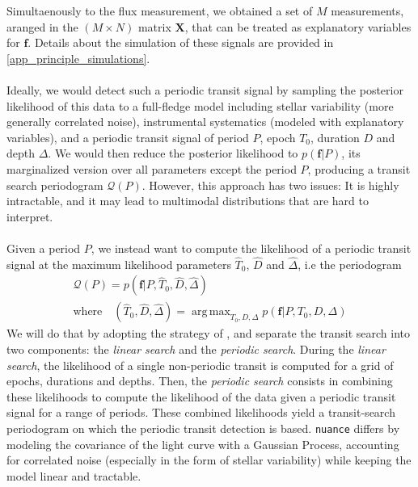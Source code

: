 \documentclass{aastex631}
\DeclareMathOperator*{\argmax}{arg\,max}
\begin{document}
Simultaenously to the flux measurement, we obtained a set of $M$ measurements, aranged in the $(M\times N)$ matrix $\bm{X}$, that can be treated as explanatory variables for $\bm{f}$. Details about the simulation of these signals are provided in \autoref{app_principle_simulations}.
\\\\
Ideally, we would detect such  a periodic transit signal by sampling the posterior likelihood of this data to a full-fledge model including stellar variability (more generally correlated noise), instrumental systematics (modeled with explanatory variables), and a periodic transit signal of period $P$, epoch $T_0$, duration $D$ and depth $\Delta$. We would then reduce the posterior likelihood to $p(\bm{f}\vert P)$, its marginalized version over all parameters except the period $P$, producing a transit search periodogram $\mathcal{Q}(P)$. However, this approach has two issues: It is highly intractable, and it may lead to multimodal distributions that are hard to interpret.
\\\\
Given a period $P$, we instead want to compute the likelihood of a periodic transit signal at the maximum likelihood parameters $\hat T_0$, $\hat D$ and $\hat \Delta$, i.e the periodogram
\begin{equation}\label{eq:periodogram}
        \begin{gathered}
        \mathcal{Q}(P) = p(\bm{f} \vert P, \hat T_0 ,\hat D, \hat \Delta) \\
        \text{where} \quad (\hat T_0 ,\hat D, \hat \Delta) = \argmax_{T_0, D, \Delta}p(\bm{f} \vert P, T_0 , D, \Delta)
    \end{gathered}
\end{equation}
We will do that by adopting the strategy of \cite{foreman2016}, and separate the transit search into two components: the \textit{linear search} and the \textit{periodic search}. During the \textit{linear search}, the likelihood of a single non-periodic transit is computed for a grid of epochs, durations and depths. Then, the \textit{periodic search} consists in combining these likelihoods to compute the likelihood of the data given a periodic transit signal for a range of periods. These combined likelihoods yield a transit-search periodogram on which the periodic transit detection is based. \texttt{nuance} differs by modeling the covariance of the light curve with a Gaussian Process, accounting for correlated noise (especially in the form of stellar variability) while keeping the model linear and tractable.
\end{document}

